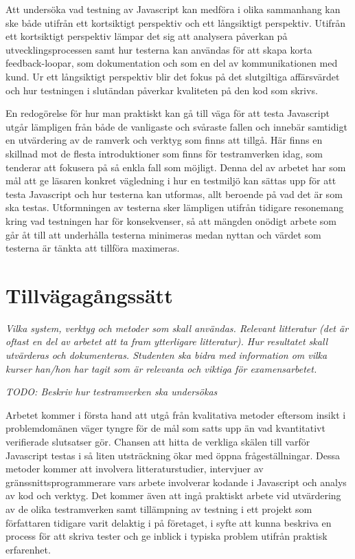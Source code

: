 \documentclass[11pt]{article}
\begin{document}
Att undersöka vad testning av Javascript kan medföra i olika sammanhang kan ske både utifrån ett kortsiktigt perspektiv och ett långsiktigt perspektiv. Utifrån ett kortsiktigt perspektiv lämpar det sig att analysera påverkan på utvecklingsprocessen samt hur testerna kan användas för att skapa korta feedback-loopar, som dokumentation och som en del av kommunikationen med kund. Ur ett långsiktigt perspektiv blir det fokus på det slutgiltiga affärsvärdet och hur testningen i slutändan påverkar kvaliteten på den kod som skrivs.

En redogörelse för hur man praktiskt kan gå till väga för att testa Javascript utgår lämpligen från både de vanligaste och svåraste fallen och innebär samtidigt en utvärdering av de ramverk och verktyg som finns att tillgå. Här finns en skillnad mot de flesta introduktioner som finns för testramverken idag, som tenderar att fokusera på så enkla fall som möjligt. Denna del av arbetet har som mål att ge läsaren konkret vägledning i hur en testmiljö kan sättas upp för att testa Javascript och hur testerna kan utformas, allt beroende på vad det är som ska testas. Utformningen av testerna sker lämpligen utifrån tidigare resonemang kring vad testningen har för konsekvenser, så att mängden onödigt arbete som går åt till att underhålla testerna minimeras medan nyttan och värdet som testerna är tänkta att tillföra maximeras.

\section{Tillvägagångssätt}

\textit{Vilka system, verktyg och metoder som skall användas. Relevant litteratur (det är oftast en del av arbetet att ta fram ytterligare litteratur). Hur resultatet skall utvärderas och dokumenteras. Studenten ska bidra med information om vilka kurser han/hon har tagit som är relevanta och viktiga för examensarbetet.}

\textit{TODO: Beskriv hur testramverken ska undersökas}

Arbetet kommer i första hand att utgå från kvalitativa metoder eftersom insikt i problemdomänen väger tyngre för de mål som satts upp än vad kvantitativt verifierade slutsatser gör. Chansen att hitta de verkliga skälen till varför Javascript testas i så liten utsträckning ökar med öppna frågeställningar. Dessa metoder kommer att involvera litteraturstudier, intervjuer av gränssnittsprogrammerare vars arbete involverar kodande i Javascript och analys av kod och verktyg. Det kommer även att ingå praktiskt arbete vid utvärdering av de olika testramverken samt tillämpning av testning i ett projekt som författaren tidigare varit delaktig i på företaget, i syfte att kunna beskriva en process för att skriva tester och ge inblick i typiska problem utifrån praktisk erfarenhet.
\end{document}
